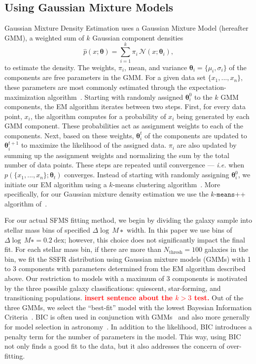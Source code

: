 \documentclass[preprint2,tighten]{aastex62}
\newcommand{\todo}[1]{{\bf \textcolor{red}{ #1}}}
\begin{document}
\subsection{Using Gaussian Mixture Models}
Gaussian Mixture Density Estimation uses a Gaussian Mixture Model 
(hereafter GMM), a weighted sum of $k$ Gaussian component densities 
\begin{equation} \label{eq:gmm}
\hat{p}(x;\bm{\theta}) = \sum\limits_{i=1}^{k} \pi_i \, \mathcal{N}(x; \bm{\theta}_i),
\end{equation}
to estimate the density. The weights, $\pi_i$, mean, and variance  
$\bm{\theta}_i=\{\mu_i, \sigma_i\}$ 
of the components are free parameters in the GMM. For a given data set 
$\{x_1, ..., x_n\}$, these parameters are most commonly estimated through
the expectation-maximization algorithm~\citep[EM;]{dempster1977,neal1998}. 
Starting with randomly assigned $\bm{\theta}_{i}^0$ to the $k$ GMM components, 
the EM algorithm iterates between two steps. First, for every data point, 
$x_i$, the algorithm computes for a probability of $x_i$ being generated by 
each GMM component. These probabilities act as assignment weights to each of
the components. Next, based on these weights, $\bm{\theta}_i^t$ of the components 
are updated to $\bm{\theta}_i^{t+1}$ to maximize the likelihood of the assigned 
data. $\pi_i$ are also updated by summing up the assignment weights and 
normalizing the sum by the total number of data points. These steps are 
repeated until convergence --- \emph{i.e.} when $p(\{x_1, ..., x_n\} ; \bm{\theta}_t)$ 
converges. Instead of starting with randomly assigning $\bm{\theta}_{i}^0$, 
we initiate our EM algorithm using a $k$-means clustering algorithm~\citep{lloyd1982}.
More specifically, for our Gaussian mixture density estimation we use 
the $k$-$\mathtt{means}$++ algorithm of~\cite{arthur2007}. 

For our actual SFMS fitting method, we begin by dividing the galaxy 
sample into stellar mass bins of specified $\Delta \log\,M∗$ width. In 
this paper we use bins of $\Delta \log\,M∗ = 0.2\  \mathrm{dex}$; however, 
this choice does not significantly impact the final fit. For each stellar 
mass bin, if there are more than $N_\mathrm{thresh}=100$ galaxies in the bin, 
we fit the SSFR distribution using Gaussian mixture models (GMMs) 
with 1 to 3 components with parameters determined from the EM algorithm 
described above. Our restriction to models with a maximum of 3 components 
is motivated by the three possible galaxy classifications: quiescent, 
star-forming, and transitioning populations. \todo{insert sentence about the $k > 3$ test.}
Out of the three GMMs, we 
select the ``best-fit'' model with the lowest Bayesian Information 
Criteria~\citep[BIC;][]{schwarz1978}. BIC is often used in conjunction with 
GMMs~\citep[\emph{e.g.}][]{leroux1992,roeder1997,fraley1998,steele2010performance} 
and also more generally for model selection in 
astronomy~\citep[\emph{e.g.}][]{liddle2007,broderick2011,vakili2016}.
In addition to the likelihood, BIC introduces a penalty term for the number
of parameters in the model. This way, using BIC not only finds a good fit to 
the data, but it also addresses the concern of over-fitting. 
\end{document}
